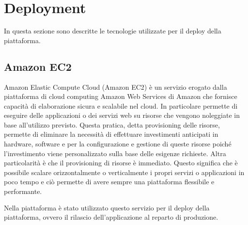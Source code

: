 \section{Deployment}
In questa sezione sono descritte le tecnologie utilizzate per il deploy della piattaforma.

\subsection{Amazon EC2}
Amazon Elastic Compute Cloud (Amazon EC2) è un servizio erogato dalla piattaforma di cloud computing Amazon Web Services di Amazon che
fornisce capacità di elaborazione sicura e scalabile nel cloud. In particolare permette di eseguire delle applicazioni
o dei servizi web su risorse che vengono noleggiate in base all'utilizzo previsto. Questa pratica, detta provisioning delle risorse,
permette di eliminare la necessità di effettuare investimenti anticipati in hardware, software e per la configurazione
e gestione di queste risorse poiché l'investimento viene personalizzato sulla base delle esigenze richieste.
Altra particolarità è che il provisioning di risorse è immediato. Questo significa che è possibile scalare orizzontalmente o verticalmente
i propri servizi o applicazioni in poco tempo e ciò permette di avere sempre una piattaforma flessibile e performante.

Nella piattaforma è stato utilizzato questo servizio per il deploy della piattaforma, ovvero il rilascio dell'applicazione al reparto di produzione.
